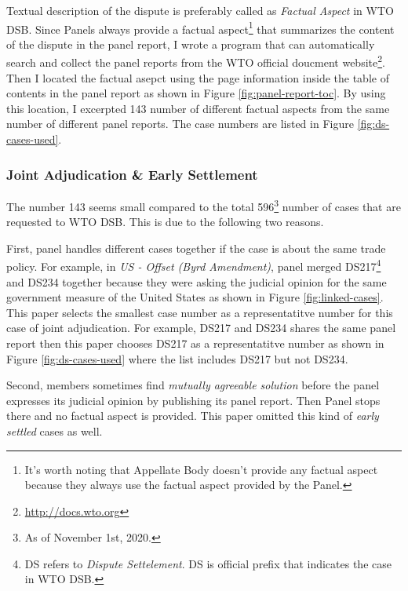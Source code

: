 Textual description of the dispute is preferably called as
\textit{Factual Aspect} in WTO DSB. 
Since Panels
always provide a factual aspect\footnote{
    It's worth noting that Appellate Body doesn't provide any factual aspect because they always use the factual aspect provided by the Panel.
}
that summarizes the content of the dispute
in the panel report, %
I wrote a program that can 
automatically search and collect 
the panel reports from the WTO official doucment website\footnote{
    \url{http://docs.wto.org}
}.
Then I located the factual asepct using the page information inside the 
table of contents in the panel report as shown in Figure \ref{fig:panel-report-toc}.
By using this location, I excerpted 143 number of different factual aspects from the same number of different panel reports. The case numbers are listed in Figure \ref{fig:ds-cases-used}.

\subsubsection{Joint Adjudication \& Early Settlement}

The number 143 seems small compared to the total 596\footnote
{As of November 1st, 2020.} number of cases that are requested to WTO DSB. This is due to the following two reasons. 

First, panel handles different cases together if the case is about the
same trade policy. For example, in \textit{US - Offset (Byrd Amendment)}, panel merged DS217\footnote{
    DS refers to \textit{Dispute Settelement}. DS is official prefix that indicates the case in WTO DSB.
} and DS234 together because they were asking the judicial opinion for the same government measure of the United States as shown in Figure \ref{fig:linked-cases}. 
This paper selects the smallest case number as a representatitve number for this case of joint adjudication. 
For example, DS217 and DS234 shares the same panel report then this paper chooses DS217 as a representatitve number as shown in Figure \ref{fig:ds-cases-used} where the list includes DS217 but not DS234.

Second, members sometimes find \textit{mutually agreeable solution} before the panel expresses its judicial opinion by publishing its panel report. Then Panel stops there and no factual aspect is provided. This paper omitted this kind of \textit{early settled} cases as well.

 

